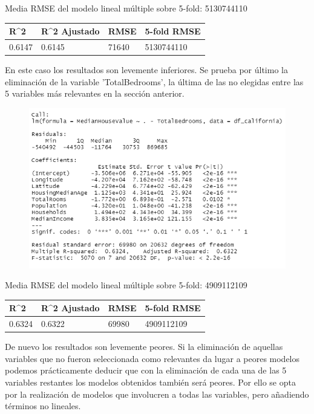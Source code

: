 Media RMSE del modelo lineal múltiple sobre 5-fold: 5130744110
\vspace{0.5cm}
\begin{table}[!h]
	\centering
	\begin{tabular}{llll}
		R\textasciicircum{}2 & R\textasciicircum{}2 Ajustado & RMSE  & 5-fold RMSE \\ \hline
		0.6147               & 0.6145                        & 71640 & 5130744110 
	\end{tabular}
\end{table}

En este caso los resultados son levemente inferiores. Se prueba por último la eliminación de la variable 'TotalBedrooms', la última de las no elegidas entre las 5 variables más relevantes en la sección anterior.
\begin{figure}[!h]
	\centering
	\includegraphics[width=0.7\linewidth]{figures/fit_multi_4}
	\caption{}
	\label{fig:fitmulti4}
\end{figure}

Media RMSE del modelo lineal múltiple sobre 5-fold: 4909112109
\vspace{0.5cm}
\begin{table}[!h]
	\centering
	\begin{tabular}{llll}
		R\textasciicircum{}2 & R\textasciicircum{}2 Ajustado & RMSE  & 5-fold RMSE \\ \hline
		0.6324               & 0.6322                        & 69980 & 4909112109 
	\end{tabular}
\end{table}

De nuevo los resultados son levemente peores. 
Si la eliminación de aquellas variables que no fueron seleccionada como relevantes da lugar a peores modelos podemos prácticamente deducir que con la eliminación de cada una de las 5 variables restantes los modelos obtenidos también será peores. Por ello se opta por la realización de modelos que involucren a todas las variables, pero añadiendo términos no lineales.\\

